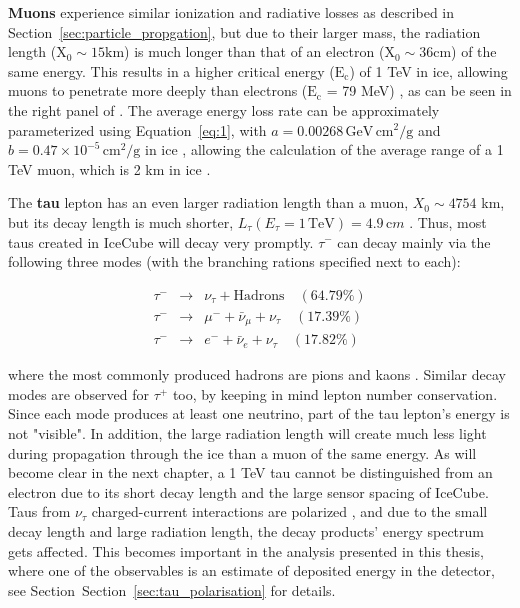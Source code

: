\textbf{Muons} experience similar ionization and radiative losses as described in Section~\ref{sec:particle_propgation}, but due to their larger mass, the radiation length ($\mathrm{X}_0 \sim 15 \mathrm{km}$) is much longer than that of an electron ($\mathrm{X}_0 \sim 36 \mathrm{cm}$) of the same energy. This results in a higher critical energy ($\mathrm{E}_\mathrm{c}$) of 1 TeV in ice, allowing muons to penetrate more deeply than electrons ($\mathrm{E}_\mathrm{c}$ = 79 MeV) \cite{MMC_paper}, as can be seen in the right panel of . The average energy loss rate can be approximately parameterized using Equation~\ref{eq:1}, with $a = 0.00268\, \mathrm{GeV}\, \mathrm{cm}^2/\mathrm{g}$ and $b = 0.47 \times 10^{-5} \, \mathrm{cm}^2/\mathrm{g}$ in ice \cite{PDG_2024}, allowing the calculation of the average range of a 1 TeV muon, which is 2 km in ice .

The \textbf{tau} lepton has an even larger radiation length than a muon, $X_0 \sim 4754$ km, but its decay length is much shorter, $L_{\tau} (E_{\tau} = 1 \, \text{TeV}) = 4.9\, \mathrm cm$ \cite{PDG_2024}. Thus, most taus created in IceCube will decay very promptly. $\tau^{-}$ can decay mainly via the following three modes (with the branching rations specified next to each):


\begin{equation}\label{eq:tau_decay}
    \begin{array}{rcl}
        \tau^{-} &\rightarrow& \nu_{\tau} + \text{Hadrons} \quad (64.79\%) \\
        \tau^{-} &\rightarrow& \mu^{-} + \bar{\nu}_{\mu} + \nu_{\tau} \quad (17.39\%) \\
        \tau^{-} &\rightarrow& e^{-} + \bar{\nu}_{e} + \nu_{\tau} \quad (17.82\%)
    \end{array}
\end{equation}
    
where the most commonly produced hadrons are pions and kaons \cite{PDG_2024}. Similar decay modes are observed for  $\tau^{+}$ too, by keeping in mind lepton number conservation. Since each mode produces at least one neutrino, part of the tau lepton's energy is not "visible". In addition, the large radiation length will create much less light during propagation through the ice than a muon of the same energy. As will become clear in the next chapter, a 1 TeV tau cannot be distinguished from an electron due to its short decay length and the large sensor spacing of IceCube. Taus from $\nu_{\tau}$ charged-current interactions are polarized , and due to the small decay length and large radiation length, the decay products' energy spectrum gets affected. This becomes important in the analysis presented in this thesis, where one of the observables is an estimate of deposited energy in the detector, see Section~Section~\ref{sec:tau_polarisation} for details.


